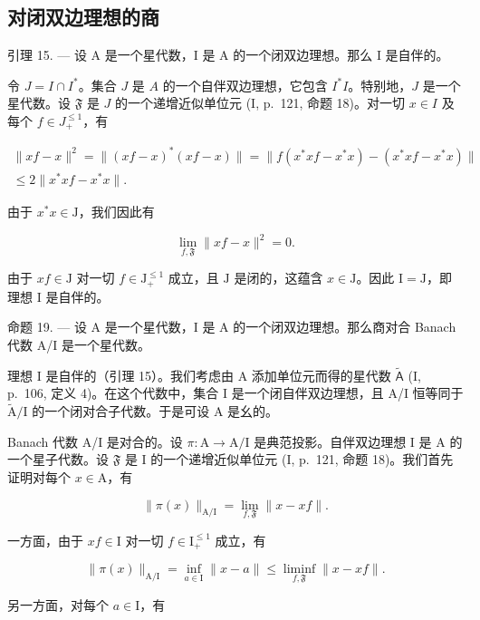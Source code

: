 \subsection{对闭双边理想的商}

引理 15. --- 设 A 是一个星代数，I 是 A 的一个闭双边理想。那么 I 是自伴的。

令 \(J = I \cap I^*\)。集合 \(J\) 是 \(A\) 的一个自伴双边理想，它包含 \(I^*I\)。特别地，\(J\) 是一个星代数。设 \(\mathfrak{F}\) 是 \(J\) 的一个递增近似单位元 (I, p.~121, 命题 18)。对一切 \(x \in I\) 及每个 \(f \in J_{+}^{\leqslant 1}\)，有

\[
\begin{array}{c} \| x f - x \| ^ {2} = \| (x f - x) ^ {*} (x f - x) \| = \| f (x ^ {*} x f - x ^ {*} x) - (x ^ {*} x f - x ^ {*} x) \| \\ \leqslant 2 \| x ^ {*} x f - x ^ {*} x \|. \end{array}
\]

由于 \(x^{*}x\in \mathrm{J}\)，我们因此有

\[
\lim _ {f, \mathfrak {F}} \| x f - x \| ^ {2} = 0.
\]

由于 \(xf \in \mathrm{J}\) 对一切 \(f \in \mathrm{J}_{+}^{\leqslant 1}\) 成立，且 \(\mathrm{J}\) 是闭的，这蕴含 \(x \in \mathrm{J}\)。因此 \(\mathrm{I} = \mathrm{J}\)，即理想 \(\mathrm{I}\) 是自伴的。

命题 19. --- 设 A 是一个星代数，I 是 A 的一个闭双边理想。那么商对合 Banach 代数 A/I 是一个星代数。

理想 I 是自伴的（引理 15）。我们考虑由 A 添加单位元而得的星代数 \(\widetilde{\mathsf{A}}\) (I, p.~106, 定义 4)。在这个代数中，集合 I 是一个闭自伴双边理想，且 A/I 恒等同于 \(\widetilde{\mathrm{A}}/\mathrm{I}\) 的一个闭对合子代数。于是可设 A 是幺的。

Banach 代数 A/I 是对合的。设 \(\pi\colon\mathrm{A}\to\mathrm{A}/\mathrm{I}\) 是典范投影。自伴双边理想 I 是 A 的一个星子代数。设 \(\mathfrak{F}\) 是 I 的一个递增近似单位元 (I, p.~121, 命题 18)。我们首先证明对每个 \(x\in\mathrm{A}\)，有

\[
\| \pi (x) \| _ {\mathrm{A/I}} = \lim _ {f, \mathfrak {F}} \| x - x f \|.\tag{6}
\]

一方面，由于 \(xf \in \mathrm{I}\) 对一切 \(f \in \mathrm{I}_{+}^{\leqslant 1}\) 成立，有

\[
\| \pi (x) \| _ {\mathrm{A} / \mathrm{I}} = \inf _ {a \in \mathrm{I}} \| x - a \| \leqslant \operatorname * {l i m i n f} _ {f, \mathfrak {F}} \| x - x f \|.
\]

另一方面，对每个 \(a \in \mathrm{I}\)，有


